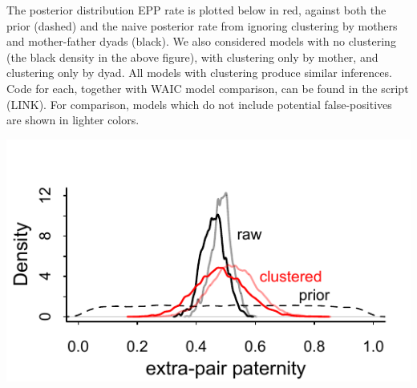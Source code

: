 \documentclass[reqno ,12pt]{amsart}
\begin{document}
The posterior distribution EPP rate is plotted below in red, against both the prior (dashed) and the naive posterior rate from ignoring clustering by mothers and mother-father dyads (black). 
We also considered models with no clustering (the black density in the above figure), with clustering only by mother, and clustering only by dyad. All models with clustering produce similar inferences. Code for each, together with WAIC model comparison, can be found in the script (LINK). 
For comparison, models which do not include potential false-positives are shown in lighter colors.

\begin{center}
	\includegraphics[scale=1]{EPP_posterior.pdf}
\end{center}



%
%
\end{document}

